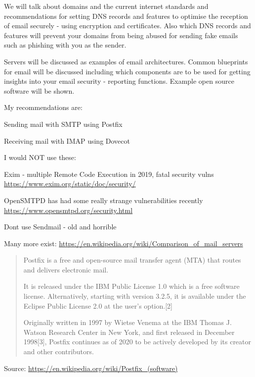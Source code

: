 \documentclass[Screen16to9,17pt]{foils}
\begin{document}

We will talk about domains and the current internet standards and recommendations for setting DNS records and features to optimise the reception of email securely - using encryption and certificates. Also which DNS records and features will prevent your domains from being abused for sending fake emails such as phishing with you as the sender.

Servers will be discussed as examples of email architectures. Common blueprints for email will be discussed including which components are to be used for getting insights into your email security - reporting functions. Example open source software will be shown.



My recommendations are:
\begin{list2}
\item Sending mail with SMTP using Postfix
\item Receiving mail with IMAP using Dovecot
\end{list2}

I would NOT use these:
\begin{list2}
\item Exim - multiple Remote Code Execution in 2019, fatal security vulns \\
\url{https://www.exim.org/static/doc/security/}
\item OpenSMTPD has had some really strange vulnerabilities recently\\
\url{https://www.opensmtpd.org/security.html}
\item Dont use Sendmail - old and horrible
\end{list2}


Many more exist: \url{https://en.wikipedia.org/wiki/Comparison_of_mail_servers}



\begin{quote}\footnotesize
  Postfix is a free and open-source mail transfer agent (MTA) that routes and delivers electronic mail.

It is released under the IBM Public License 1.0 which is a free software license. Alternatively, starting with version 3.2.5, it is available under the Eclipse Public License 2.0 at the user's option.[2]

Originally written in 1997 by Wietse Venema at the IBM Thomas J. Watson Research Center in New York, and first released in December 1998[3], Postfix continues as of 2020 to be actively developed by its creator and other contributors.
\end{quote}
Source: \url{https://en.wikipedia.org/wiki/Postfix_(software)}
\end{document}
